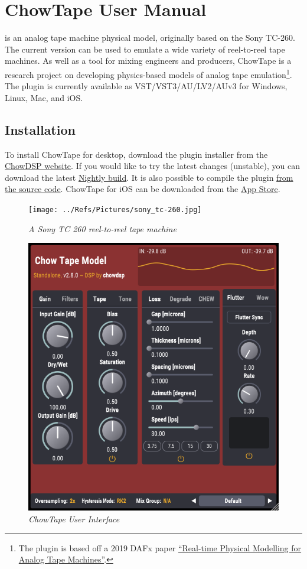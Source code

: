 \documentclass[landscape,twocolumn,a5paper]{manual}
\begin{document}
\section{ChowTape User Manual}

\noindent
{} is an analog tape machine physical model,
originally based on the Sony TC-260. The current version
can be used to emulate a wide variety of reel-to-reel tape
machines. As well as a tool for mixing engineers and producers,
ChowTape is a research project on developing physics-based
models of analog tape emulation\footnote{The plugin is based off a 2019 DAFx paper
\href{http://dafx2019.bcu.ac.uk/papers/DAFx2019_paper_3.pdf}{``Real-time Physical Modelling for Analog Tape Machines''}.}.
The plugin is currently available as VST/VST3/AU/LV2/AUv3 for
Windows, Linux, Mac, and iOS.

\subsection{Installation}
To install ChowTape for desktop, download the plugin installer
from the \href{https://chowdsp.com/products.html#tape}{ChowDSP website}.
If you would like to try the latest changes (unstable), you can
download the latest \href{https://chowdsp.com/nightly.html}{Nightly build}.
It is also possible to compile the plugin
\href{https://github.com/jatinchowdhury18/AnalogTapeModel/blob/master/BUILDING.md}{from the source code}.
ChowTape for iOS can be downloaded from the
\href{https://apps.apple.com/us/app/chowtapemodel/id1557806564}{App Store}.

\begin{figure}[ht]
    \center
    \texttt{[image: ../Refs/Pictures/sony\_tc-260.jpg]}
    \caption{\label{TapeMachine}{\it A Sony TC 260 reel-to-reel tape machine}}
\end{figure}

\begin{figure}[ht]
    \center
    \includegraphics[width=0.55\columnwidth]{../Plugin/Screenshots/full_gui.png}
    \caption{\label{full_gui}{\it ChowTape User Interface}}
\end{figure}
\end{document}
